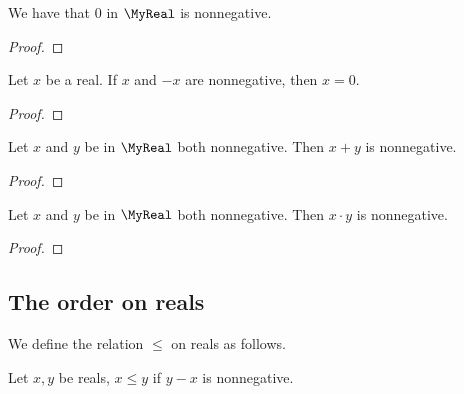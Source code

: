 \begin{lemma}
    \leanok
    We have that $0$ in $\MyReal$ is nonnegative.
\end{lemma}
\begin{proof}
    \leanok
\end{proof}

\begin{lemma}
    \leanok
    Let $x$ be a real.
    If $x$ and $-x$ are nonnegative, then $x = 0$.
\end{lemma}
\begin{proof}
    \leanok
\end{proof}

\begin{lemma}
    \leanok
    Let $x$ and $y$ be in $\MyReal$ both nonnegative. Then $x+y$ is nonnegative.
\end{lemma}
\begin{proof}
    \leanok
\end{proof}

\begin{lemma}
    \leanok
    Let $x$ and $y$ be in $\MyReal$ both nonnegative. Then $x \cdot y$ is nonnegative.
\end{lemma}
\begin{proof}
    \leanok
\end{proof}


\subsection{The order on reals}

\begin{definition}
    \leanok
    We define the relation $\leq$ on reals as follows.

    Let $x,y$ be reals, $x \leq y$ if $y - x$ is nonnegative.
\end{definition}

